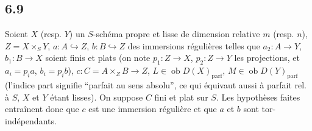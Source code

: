 \documentclass[11pt]{article}
\newcommand{\ob}{\operatorname{ob}}
\providecommand{\parf}{\mathrm{parf}}
\providecommand{\ob}{\operatorname{ob}}
\providecommand{\parf}{\mathrm{parf}}
\begin{document}
\subsection*{6.9}

Soient $X$ (resp. $Y$) un $S$-schéma propre et lisse de dimension relative $m$ (resp. $n$), $Z=X\times_S Y$, $a:A\hookrightarrow Z$, $b:B\hookrightarrow Z$ des immersions régulières telles que $a_2:A\to Y$, $b_1:B\to X$ soient finis et plats (on note $p_1:Z\to X$, $p_2:Z\to Y$ les projections, et $a_i=p_i a$, $b_i=p_i b$), $c:C=A\times_Z B\to Z$, $L\in\ob D(X)_{\parf}$, $M\in\ob D(Y)_{\parf}$ (l'indice part signifie ``parfait au sens absolu'', ce qui équivaut aussi à parfait rel. à $S$, $X$ et $Y$ étant lisses). On suppose $C$ fini et plat sur $S$. Les hypothèses faites entraînent donc que $c$ est une immersion régulière et que $a$ et $b$ sont tor-indépendants.
\end{document}
